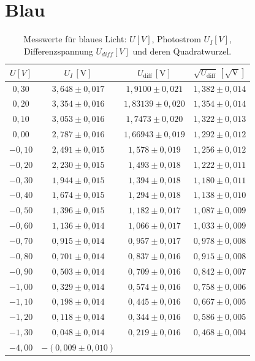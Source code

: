 \newpage

\section{Blau}
\begin{table}[h!]
    \centering
    \begin{tabular}{cccc}
    \hline
    $U [V]$ & $U_I \, [\mathrm{V}]$ & $U_{\text{diff}} \, [\mathrm{V}]$ & $\sqrt{U_{\text{diff}}} \, [\mathrm{\sqrt{V}}]$ \\
    \hline
    $0,30$ & $3,648 \pm 0,017$ & $1,9100 \pm 0,021$ & $1,382 \pm 0,014$ \\
    $0,20$ & $3,354 \pm 0,016$ & $1,83139 \pm 0,020$ & $1,354 \pm 0,014$ \\
    $0,10$ & $3,053 \pm 0,016$ & $1,7473 \pm 0,020$ & $1,322 \pm 0,013$ \\
    $0,00$ & $2,787 \pm 0,016$ & $1,66943 \pm 0,019$ & $1,292 \pm 0,012$ \\
    $-0,10$ & $2,491 \pm 0,015$ & $1,578 \pm 0,019$ & $1,256 \pm 0,012$ \\
    $-0,20$ & $2,230 \pm 0,015$ & $1,493 \pm 0,018$ & $1,222 \pm 0,011$ \\
    $-0,30$ & $1,944 \pm 0,015$ & $1,394 \pm 0,018$ & $1,180 \pm 0,011$ \\
    $-0,40$ & $1,674 \pm 0,015$ & $1,294 \pm 0,018$ & $1,138 \pm 0,010$ \\
    $-0,50$ & $1,396 \pm 0,015$ & $1,182 \pm 0,017$ & $1,087 \pm 0,009$ \\
    $-0,60$ & $1,136 \pm 0,014$ & $1,066 \pm 0,017$ & $1,033 \pm 0,009$ \\
    $-0,70$ & $0,915 \pm 0,014$ & $0,957 \pm 0,017$ & $0,978 \pm 0,008$ \\
    $-0,80$ & $0,701 \pm 0,014$ & $0,837 \pm 0,016$ & $0,915 \pm 0,008$ \\
    $-0,90$ & $0,503 \pm 0,014$ & $0,709 \pm 0,016$ & $0,842 \pm 0,007$ \\
    $-1,00$ & $0,329 \pm 0,014$ & $0,574 \pm 0,016$ & $0,758 \pm 0,006$ \\
    $-1,10$ & $0,198 \pm 0,014$ & $0,445 \pm 0,016$ & $0,667 \pm 0,005$ \\
    $-1,20$ & $0,118 \pm 0,014$ & $0,344 \pm 0,016$ & $0,586 \pm 0,005$ \\
    $-1,30$ & $0,048 \pm 0,014$ & $0,219 \pm 0,016$ & $0,468 \pm 0,004$ \\
    $-4,00$ & $-(0,009 \pm 0,010)$ & & \\
    \hline
    \end{tabular}
    \caption{Messwerte für blaues Licht: $U [V]$, Photostrom $U_I [V]$, Differenzspannung $U_{diff} [V]$ und deren Quadratwurzel.}
    \label{tab:blau_values}
\end{table}


